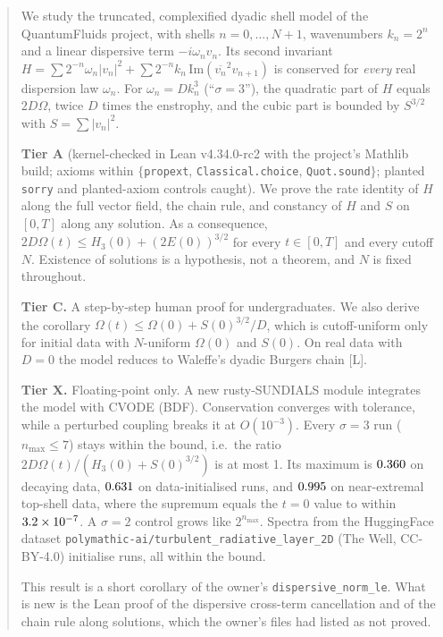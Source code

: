 \documentclass[11pt]{article}
\theoremstyle{remark}
\newcommand{\tier}[1]{\textsf{[#1]}}
\newcommand{\lean}[1]{\texttt{#1}}
\newcommand{\cj}[1]{\overline{#1}}
\begin{document}
\begin{abstract}
We study the truncated, complexified dyadic shell model of the QuantumFluids project, with shells $n=0,\dots,N+1$, wavenumbers
$k_n=2^n$ and a linear dispersive term $-i\omega_n v_n$. Its second invariant
$H=\sum 2^{-n}\omega_n|v_n|^2+\sum 2^{-n}k_n\,\mathrm{Im}(\cj{v_n}^2v_{n+1})$ is conserved for \emph{every} real dispersion
law $\omega_n$. For $\omega_n=Dk_n^3$ (``$\sigma=3$''), the quadratic part of $H$ equals $2D\Omega$, twice $D$ times the enstrophy, and the
cubic part is bounded by $S^{3/2}$ with $S=\sum|v_n|^2$.

\textbf{Tier A} (kernel-checked in Lean v4.34.0-rc2 with the project's Mathlib build; axioms within
$\{$\lean{propext}, \lean{Classical.choice}, \lean{Quot.sound}$\}$; planted \lean{sorry} and planted-axiom controls caught).
We prove the rate identity of $H$ along the full vector field, the chain rule, and constancy of $H$ and $S$ on $[0,T]$ along any
solution. As a consequence, $2D\Omega(t)\le H_3(0)+(2E(0))^{3/2}$ for every $t\in[0,T]$ and every cutoff $N$. Existence of
solutions is a hypothesis, not a theorem, and $N$ is fixed throughout.

\textbf{Tier C.} A step-by-step human proof for undergraduates. We also derive the corollary
$\Omega(t)\le\Omega(0)+S(0)^{3/2}/D$, which is cutoff-uniform only for initial data with $N$-uniform $\Omega(0)$ and $S(0)$.
On real data with $D=0$ the model reduces to Waleffe's dyadic Burgers chain \tier{L}.

\textbf{Tier X.} Floating-point only. A new rusty-SUNDIALS module integrates the model with CVODE (BDF). Conservation
converges with tolerance, while a perturbed coupling breaks it at $O(10^{-3})$. Every $\sigma=3$ run ($n_{\max}\le7$) stays
within the bound, i.e.\ the ratio $2D\Omega(t)/(H_3(0)+S(0)^{3/2})$ is at most 1. Its maximum is $\SthreeMaxRatio$ on decaying
data, $\WMaxRatio$ on data-initialised runs, and $\CthreeMax$ on near-extremal top-shell data, where the supremum equals the
$t=0$ value to within $\CthreeGapAbs$. A $\sigma=2$ control grows like $2^{n_{\max}}$. Spectra from the HuggingFace dataset
\texttt{polymathic-ai/turbulent\_radiative\_layer\_2D} (The Well, CC-BY-4.0) initialise \WNruns{} runs, all within the bound.

This result is a short corollary of the owner's \lean{dispersive\_norm\_le}. What is new is the Lean proof of the dispersive cross-term
cancellation and of the chain rule along solutions, which the owner's files had listed as not proved.
\end{abstract}
\end{document}
